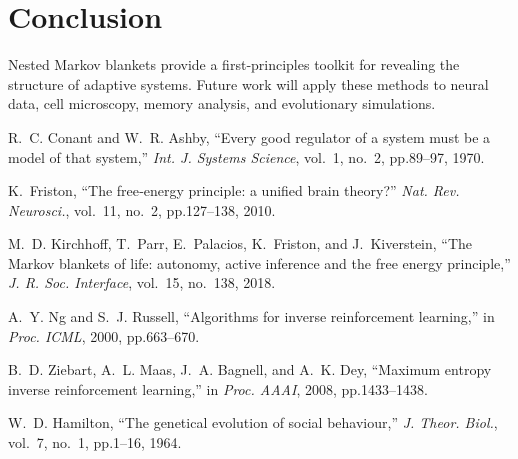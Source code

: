 \documentclass[10pt,conference]{IEEEtran}
\begin{document}
\section{Conclusion}
Nested Markov blankets provide a first‐principles toolkit for revealing the structure of adaptive systems.  Future work will apply these methods to neural data, cell microscopy, memory analysis, and evolutionary simulations.




\begin{thebibliography}{1}
R.~C. Conant and W.~R. Ashby, ``Every good regulator of a system must be a model of that system,'' \emph{Int. J. Systems Science}, vol.~1, no.~2, pp.89--97, 1970.

K.~Friston, ``The free‐energy principle: a unified brain theory?'' \emph{Nat. Rev. Neurosci.}, vol.~11, no.~2, pp.127--138, 2010.

M.~D. Kirchhoff, T.~Parr, E.~Palacios, K.~Friston, and J.~Kiverstein, ``The Markov blankets of life: autonomy, active inference and the free energy principle,'' \emph{J. R. Soc. Interface}, vol.~15, no.~138, 2018.

A.~Y. Ng and S.~J. Russell, ``Algorithms for inverse reinforcement learning,'' in \emph{Proc. ICML}, 2000, pp.663--670.

B.~D. Ziebart, A.~L. Maas, J.~A. Bagnell, and A.~K. Dey, ``Maximum entropy inverse reinforcement learning,'' in \emph{Proc. AAAI}, 2008, pp.1433--1438.

W.~D. Hamilton, ``The genetical evolution of social behaviour,'' \emph{J. Theor. Biol.}, vol.~7, no.~1, pp.1--16, 1964.
\end{thebibliography}
\end{document}
